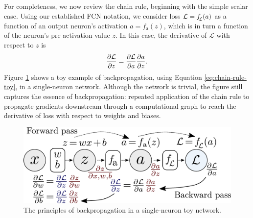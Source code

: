 \documentclass[11pt, a4paper]{article}
\begin{document}
For completeness, we now review the chain rule, beginning with the simple scalar case. Using our established FCN notation, we consider loss $ \mathcal{L} = f_{\raisebox{-0.4ex}{\scalebox{0.7}{$\mspace{-3mu} \mathcal{L}$}}}(a) $ as a function of an output neuron's activation $ a = f_{\text{a}}(z) $, which is in turn a function of the neuron's pre-activation value $ z $. In this case, the derivative of $ \mathcal{L} $ with respect to $ z $ is
\begin{equation}
    \pdv{\mathcal{L}}{z} = \pdv{\mathcal{L}}{a} \pdv{a}{z}. \label{eq:chain-rule-toy}
\end{equation}
Figure \ref{fig:backprop-toy} shows a toy example of backpropagation, using Equation \ref{eq:chain-rule-toy}, in a single-neuron network. Although the network is trivial, the figure still captures the essence of backpropagation: repeated application of the chain rule to propagate gradients downstream through a computational graph to reach the derivative of loss with respect to weights and biases.

\begin{figure}[htb!]
    \centering
    \includegraphics[width=0.80\linewidth]{vector/backprop-toy.pdf}
    \vspace{-3mm}
    \caption{The principles of backpropagation in a single-neuron toy network.}
    \label{fig:backprop-toy}
\end{figure}
\end{document}
